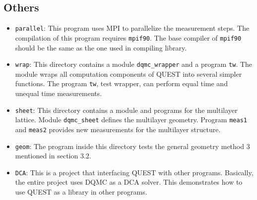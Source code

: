 \documentclass[12pt]{article}
\begin{document}
\subsection{Others}
\begin{itemize}
  \item \verb"parallel": This program uses MPI to parallelize the measurement steps. The compilation of this program requires \verb|mpif90|. The base compiler of \verb|mpif90| should be the same as the one used in compiling library.
  \item \verb"wrap": This directory contains a module \verb|dqmc_wrapper| and a program \verb|tw|. The module wraps all computation components of QUEST into several simpler functions. The program \verb"tw", test wrapper, can perform equal time and unequal time measurements.
  \item \verb"sheet": This directory contains a module and programs for the multilayer lattice. Module \verb"dqmc_sheet" defines the multilayer geometry. Program \verb"meas1" and \verb"meas2" provides new measurements for the multilayer structure.
  \item \verb"geom": The program inside this directory tests the general geometry method 3 mentioned in section 3.2.
  \item \verb"DCA": This is a project that interfacing QUEST with other programs. Basically, the entire project uses DQMC as a DCA solver. This demonstrates how to use QUEST as a library in other programs.
\end{itemize}

%
%
\end{document}
